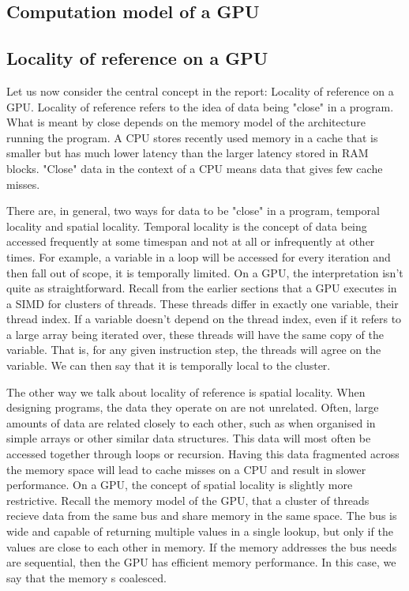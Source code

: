 \documentclass{article}
\begin{document}
\subsection{Computation model of a GPU}

\subsection{Locality of reference on a GPU}

Let us now consider the central concept in the report: Locality of reference on a GPU. Locality of reference refers to the idea of data being "close" in a
program. What is meant by close depends on the memory model of the architecture running the program. A CPU stores recently used memory in a cache that is
smaller but has much lower latency than the larger latency stored in RAM blocks. "Close" data in the context of a CPU means data that gives few cache misses.

There are, in general, two ways for data to be "close" in a program, temporal locality and spatial locality. Temporal locality is the concept of data being
accessed frequently at some timespan and not at all or infrequently at other times. For example, a variable in a loop will be accessed for every iteration and
then fall out of scope, it is temporally limited. On a GPU, the interpretation isn't quite as straightforward. Recall from the earlier sections that a GPU
executes in a SIMD for clusters of threads. These threads differ in exactly one variable, their thread index. If a variable doesn't depend on the thread index,
even if it refers to a large array being iterated over, these threads will have the same copy of the variable. That is, for any given instruction step, the
threads will agree on the variable. We can then say that it is temporally local to the cluster.

The other way we talk about locality of reference is spatial locality. When designing programs, the data they operate on are not unrelated. Often, large amounts
of data are related closely to each other, such as when organised in simple arrays or other similar data structures. This data will most often be accessed
together through loops or recursion. Having this data fragmented across the memory space will lead to cache misses on a CPU and result in slower performance. On
a GPU, the concept of spatial locality is slightly more restrictive. Recall the memory model of the GPU, that a cluster of threads recieve data from the same
bus and share memory in the same space. The bus is wide and capable of returning multiple values in a single lookup, but only if the values are close to each
other in memory. If the memory addresses the bus needs are sequential, then the GPU has efficient memory performance. In this case, we say that the memory s
coalesced.
\end{document}
